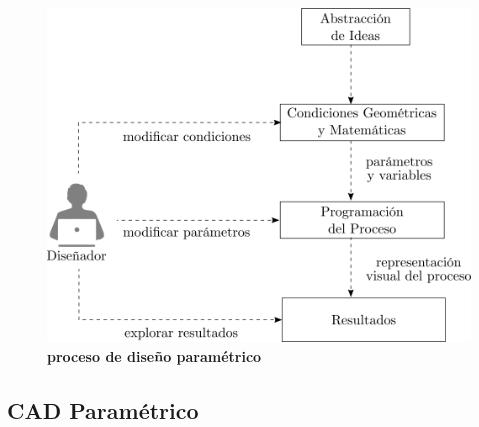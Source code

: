 \begin{figure}[h]
\includegraphics[width=12cm]{Img/CPD/diseno.png}
\centering
\caption{\textbf{\footnotesize{proceso de diseño paramétrico}}}
\label{fig:procesopar}
\end{figure}


\subsection{CAD Paramétrico}

